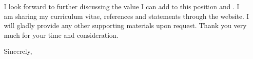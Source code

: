 \documentclass[9pt]{article}
\begin{document}

I look forward to further discussing the value I can add to this position and \InstitutionName{}. I am sharing my curriculum vitae, references and statements through the website.
I will gladly provide any other supporting materials upon request. Thank you very much for your time and consideration.

Sincerely, \\
\Name{} 

\end{document}

